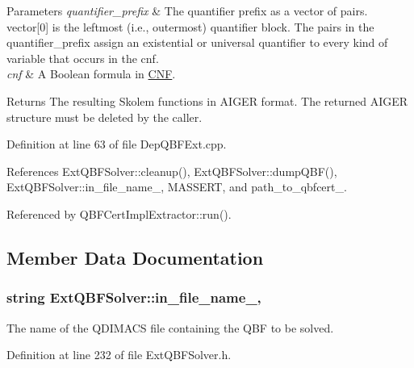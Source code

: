 \begin{DoxyParams}{Parameters}
{\em quantifier\-\_\-prefix} & The quantifier prefix as a vector of pairs. vector\mbox{[}0\mbox{]} is the leftmost (i.\-e., outermost) quantifier block. The pairs in the quantifier\-\_\-prefix assign an existential or universal quantifier to every kind of variable that occurs in the cnf. \\
\hline
{\em cnf} & A Boolean formula in \hyperlink{classCNF}{C\-N\-F}. \\
\hline
\end{DoxyParams}
\begin{DoxyReturn}{Returns}
The resulting Skolem functions in A\-I\-G\-E\-R format. The returned A\-I\-G\-E\-R structure must be deleted by the caller. 
\end{DoxyReturn}


Definition at line 63 of file Dep\-Q\-B\-F\-Ext.\-cpp.



References Ext\-Q\-B\-F\-Solver\-::cleanup(), Ext\-Q\-B\-F\-Solver\-::dump\-Q\-B\-F(), Ext\-Q\-B\-F\-Solver\-::in\-\_\-file\-\_\-name\-\_\-, M\-A\-S\-S\-E\-R\-T, and path\-\_\-to\-\_\-qbfcert\-\_\-.



Referenced by Q\-B\-F\-Cert\-Impl\-Extractor\-::run().



\subsection{Member Data Documentation}
\hypertarget{classExtQBFSolver_a04d2ff483c22a11344e46d66ae7e76b1}{
\subsubsection[{in\-\_\-file\-\_\-name\-\_\-}]{\setlength{\rightskip}{0pt plus 5cm}string Ext\-Q\-B\-F\-Solver\-::in\-\_\-file\-\_\-name\-\_\-\hspace{0.3cm}{\ttfamily [protected]}, {\ttfamily [inherited]}}}\label{classExtQBFSolver_a04d2ff483c22a11344e46d66ae7e76b1}


The name of the Q\-D\-I\-M\-A\-C\-S file containing the Q\-B\-F to be solved. 



Definition at line 232 of file Ext\-Q\-B\-F\-Solver.\-h.



